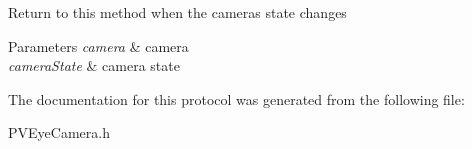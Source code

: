 Return to this method when the camera\textquotesingle{}s state changes


\begin{DoxyParams}{Parameters}
{\em camera} & camera \\
\hline
{\em camera\+State} & camera state \\
\hline
\end{DoxyParams}


The documentation for this protocol was generated from the following file\+:\begin{DoxyCompactItemize}
\item 
P\+V\+Eye\+Camera.\+h\end{DoxyCompactItemize}
